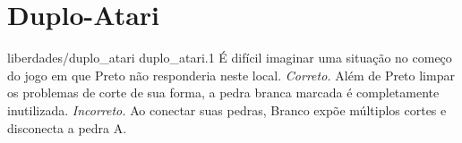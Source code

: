 \chapter{Duplo-Atari}

\emptypage

\problemAnswerDiagram
  {liberdades/duplo_atari}
  {duplo_atari.1}
  {É difícil imaginar uma situação no começo do jogo em que Preto não responderia neste local.}
  {\emph{Correto.} Além de Preto limpar os problemas de corte de sua forma, a pedra branca marcada é completamente inutilizada.}
  {\emph{Incorreto.} Ao conectar suas pedras, Branco expõe múltiplos cortes e disconecta a pedra A.}

\clearedpage
\clearedpage